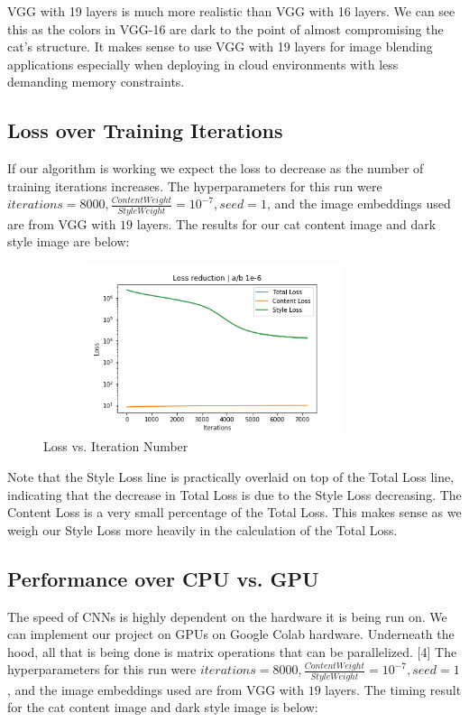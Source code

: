 \documentclass{article}
\begin{document}
\noindent VGG with 19 layers is much more realistic than VGG with 16 layers. We can see this as the colors in VGG-16 are dark to the point of almost compromising the cat's structure. It makes sense to use VGG with 19 layers for image blending applications especially when deploying in cloud environments with less demanding memory constraints.

\subsection{Loss over Training Iterations}

If our algorithm is working we expect the loss to decrease as the number of training iterations increases. The hyperparameters for this run were $iterations = 8000, \frac{Content Weight}{Style Weight} = 10^{-7}, seed = 1$, and the image embeddings used are from VGG with $19$ layers. The results for our cat content image and dark style image are below:

\begin{figure}[H]
    \centering
    \includegraphics[height=5cm,width=10cm]{Loss}
    \caption{Loss vs. Iteration Number}
    \label{fig:sfig1}
\end{figure}

Note that the Style Loss line is practically overlaid on top of the Total Loss line, indicating that the decrease in Total Loss is due to the Style Loss decreasing. The Content Loss is a very small percentage of the Total Loss. This makes sense as we weigh our Style Loss more heavily in the calculation of the Total Loss.

\subsection{Performance over CPU vs. GPU}

The speed of CNNs is highly dependent on the hardware it is being run on. We can implement our project on GPUs on Google Colab hardware. Underneath the hood, all that is being done is matrix operations that can be parallelized. [4] The hyperparameters for this run were $iterations = 8000, \frac{Content Weight}{Style Weight} = 10^{-7}, seed = 1$, and the image embeddings used are from VGG with $19$ layers. The timing result for the cat content image and dark style image is below:
\end{document}
